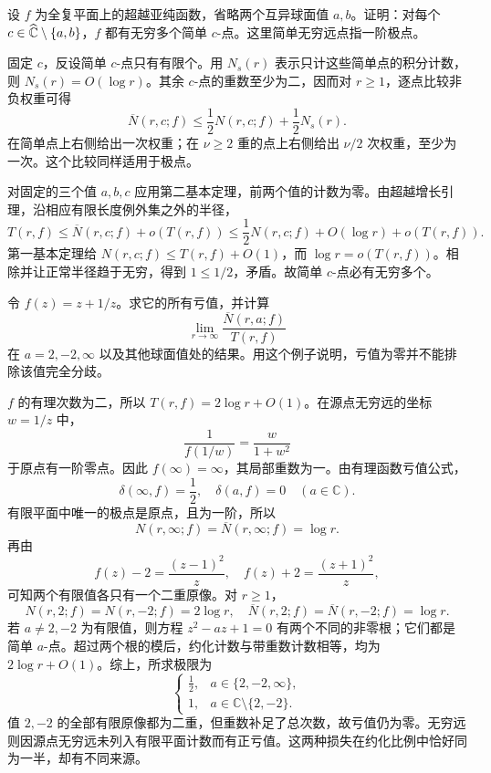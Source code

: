 \begin{exercise}\label{b3:ex:C-3}
设 \(f\) 为全复平面上的超越亚纯函数，省略两个互异球面值 \(a,b\)。证明：对每个 \(c\in\widehat{\mathbb C\kern0pt}\setminus\{a,b\}\)，\(f\) 都有无穷多个简单 \(c\)-点。这里简单无穷远点指一阶极点。
\end{exercise}
\begin{solution}
固定 \(c\)，反设简单 \(c\)-点只有有限个。用 \(N_s(r)\) 表示只计这些简单点的积分计数，则 \(N_s(r)=O(\log r)\)。其余 \(c\)-点的重数至少为二，因而对 \(r\ge1\)，逐点比较非负权重可得
\[
 \overline N(r,c;f)
 \le\frac12N(r,c;f)+\frac12N_s(r).
\]
在简单点上右侧给出一次权重；在 \(\nu\ge2\) 重的点上右侧给出 \(\nu/2\) 次权重，至少为一次。这个比较同样适用于极点。

对固定的三个值 \(a,b,c\) 应用第二基本定理，前两个值的计数为零。由超越增长引理，沿相应有限长度例外集之外的半径，
\[
 T(r,f)\le\overline N(r,c;f)+o(T(r,f))
 \le\frac12N(r,c;f)+O(\log r)+o(T(r,f)).
\]
第一基本定理给 \(N(r,c;f)\le T(r,f)+O(1)\)，而 \(\log r=o(T(r,f))\)。相除并让正常半径趋于无穷，得到 \(1\le1/2\)，矛盾。故简单 \(c\)-点必有无穷多个。
\end{solution}

\begin{exercise}\label{b3:ex:C-4}
令 \(f(z)=z+1/z\)。求它的所有亏值，并计算
\[
 \lim_{r\to\infty}\frac{\overline N(r,a;f)}{T(r,f)}
\]
在 \(a=2,-2,\infty\) 以及其他球面值处的结果。用这个例子说明，亏值为零并不能排除该值完全分歧。
\end{exercise}
\begin{solution}
\(f\) 的有理次数为二，所以 \(T(r,f)=2\log r+O(1)\)。在源点无穷远的坐标 \(w=1/z\) 中，
\[
 \frac1{f(1/w)}=\frac{w}{1+w^2}
\]
于原点有一阶零点。因此 \(f(\infty)=\infty\)，其局部重数为一。由有理函数亏值公式，
\[
 \delta(\infty,f)=\frac12,
 \quad\delta(a,f)=0\quad(a\in\mathbb C).
\]
有限平面中唯一的极点是原点，且为一阶，所以
\[
 N(r,\infty;f)=\overline N(r,\infty;f)=\log r.
\]
再由
\[
 f(z)-2=\frac{(z-1)^2}{z},
 \quad f(z)+2=\frac{(z+1)^2}{z},
\]
可知两个有限值各只有一个二重原像。对 \(r\ge1\)，
\[
 N(r,2;f)=N(r,-2;f)=2\log r,
 \quad \overline N(r,2;f)=\overline N(r,-2;f)=\log r.
\]
若 \(a\ne2,-2\) 为有限值，则方程 \(z^2-az+1=0\) 有两个不同的非零根；它们都是简单 \(a\)-点。超过两个根的模后，约化计数与带重数计数相等，均为 \(2\log r+O(1)\)。综上，所求极限为
\[
 \begin{cases}
  \frac12,&a\in\{2,-2,\infty\},\\
  1,&a\in\mathbb C\setminus\{2,-2\}.
 \end{cases}
\]
值 \(2,-2\) 的全部有限原像都为二重，但重数补足了总次数，故亏值仍为零。无穷远则因源点无穷远未列入有限平面计数而有正亏值。这两种损失在约化比例中恰好同为一半，却有不同来源。
\end{solution}

